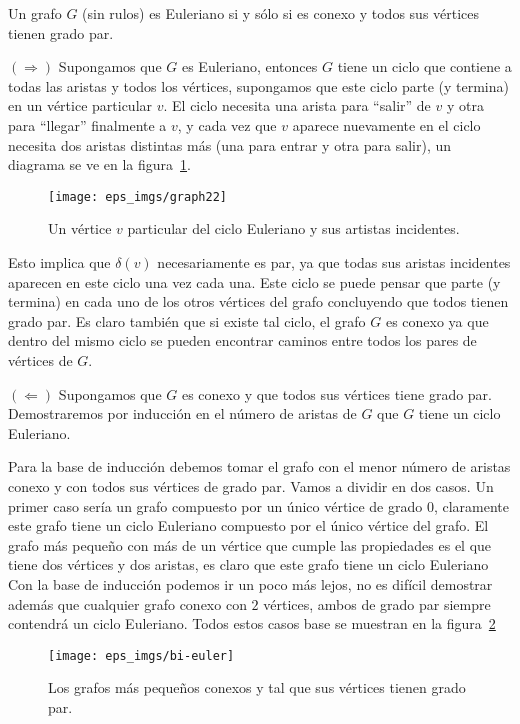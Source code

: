\begin{teorema}\label{teo:euler}
Un grafo $G$ (sin rulos) es Euleriano si y sólo si es conexo y todos sus vértices tienen grado par.

\begin{demostracion}
$(\Rightarrow)$ Supongamos que $G$ es Euleriano, entonces $G$ tiene un ciclo que contiene a todas las aristas y todos los vértices, supongamos que este ciclo parte (y termina) en un vértice particular $v$.
El ciclo necesita una arista para ``salir'' de $v$ y otra para ``llegar'' finalmente a $v$, y cada vez que $v$ aparece nuevamente en el ciclo necesita dos aristas distintas más (una para entrar y otra para salir), un diagrama se ve en la figura~\ref{fig:graph22}.
\begin{figure}[h!]
\centering
\texttt{[image: eps\_imgs/graph22]}
\caption{Un vértice $v$ particular del ciclo Euleriano y sus artistas incidentes.}
\label{fig:graph22}
\end{figure}
Esto implica que $\delta(v)$ necesariamente es par, ya que todas sus aristas incidentes aparecen en este ciclo una vez cada una.
Este ciclo se puede pensar que parte (y termina) en cada uno de los otros vértices del grafo concluyendo que todos tienen grado par.
Es claro también que si existe tal ciclo, el grafo $G$ es conexo ya que dentro del mismo ciclo se pueden encontrar caminos entre todos los pares de vértices de $G$.

$(\Leftarrow)$ Supongamos que $G$ es conexo y que todos sus vértices tiene grado par.
Demostraremos por inducción en el número de aristas de $G$ que $G$ tiene un ciclo Euleriano.
\begin{inducciondemo}  \BI Para la base de inducción debemos tomar el grafo con el menor número de aristas conexo y con todos sus vértices de grado par.
  Vamos a dividir en dos casos.
  Un primer caso sería un grafo compuesto por un único vértice de grado $0$, claramente este grafo tiene un ciclo Euleriano compuesto por el único vértice del grafo.
	El grafo más pequeño con más de un vértice que cumple las propiedades es el que tiene dos vértices y dos aristas, es claro que este grafo tiene un ciclo Euleriano 
  Con la base de inducción podemos ir un poco más lejos, no es difícil demostrar además que cualquier grafo conexo con $2$ vértices, ambos de grado par siempre contendrá un ciclo Euleriano.
  Todos estos casos base se muestran en la figura~\ref{fig:bi-euler}
 
\begin{figure}[h!]
\centering
\texttt{[image: eps\_imgs/bi-euler]}
\caption{Los grafos más pequeños conexos y tal que sus vértices tienen grado par.}
\label{fig:bi-euler}
\end{figure}


\end{inducciondemo}
\end{demostracion}
\end{teorema}
